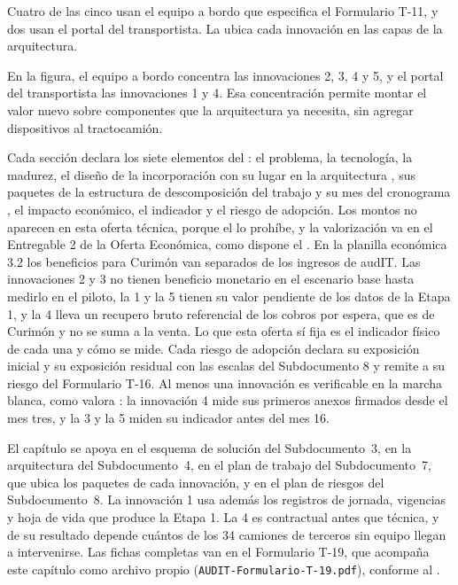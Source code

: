 Cuatro de las cinco usan el equipo a bordo que especifica el Formulario T-11, y dos usan el portal del
transportista. La  ubica cada innovación en las capas de la arquitectura.


En la figura, el equipo a bordo concentra las innovaciones 2, 3, 4 y 5, y el portal del transportista
las innovaciones 1 y 4. Esa concentración permite montar el valor nuevo sobre componentes que la
arquitectura ya necesita, sin agregar dispositivos al tractocamión.

Cada sección declara los siete elementos del : el problema, la tecnología, la madurez, el
diseño de la incorporación con su lugar en la arquitectura , sus paquetes de la
estructura de descomposición del trabajo y su mes del cronograma , el impacto
económico, el indicador y el riesgo de adopción. Los montos no aparecen en esta oferta técnica, porque
el  lo prohíbe, y la valorización va en el Entregable 2 de la Oferta Económica, como
dispone el . En la planilla económica 3.2 los beneficios para Curimón van separados de
los ingresos de audIT. Las innovaciones 2 y 3 no tienen beneficio monetario en el escenario base hasta
medirlo en el piloto, la 1 y la 5 tienen su valor pendiente de los datos de la Etapa 1, y la 4 lleva un
recupero bruto referencial de los cobros por espera, que es de Curimón y no se suma a la venta. Lo que
esta oferta sí fija es el indicador físico de cada una y cómo se mide. Cada riesgo de adopción declara
su exposición inicial y su exposición residual con las escalas del Subdocumento 8 y remite a su riesgo
del Formulario T-16. Al menos una innovación es verificable en la marcha blanca, como valora
: la innovación 4 mide sus primeros anexos firmados desde el mes tres, y la 3 y
la 5 miden su indicador antes del mes 16.

El capítulo se apoya en el esquema de solución del Subdocumento~3, en la arquitectura del
Subdocumento~4, en el plan de trabajo del Subdocumento~7, que ubica los paquetes de cada innovación, y
en el plan de riesgos del Subdocumento~8. La innovación 1 usa además los registros de jornada, vigencias y
hoja de vida que produce la Etapa 1. La 4 es contractual antes que técnica, y de su resultado depende cuántos de los 34
camiones de terceros sin equipo llegan a intervenirse. Las fichas completas van en el Formulario T-19, que acompaña
este capítulo como archivo propio (\texttt{AUDIT-Formulario-T-19.pdf}), conforme al
.

